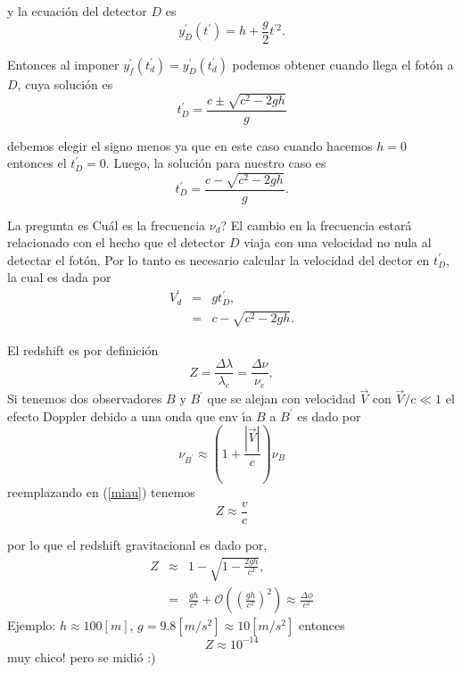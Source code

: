 \documentclass[notitlepage,11pt]{article}
\begin{document}
y la ecuaci\'{o}n del detector $D$ es 
\begin{equation}
y_{D}^{\prime }\left( t^{\prime }\right) =h+\frac{g}{2}t^{\prime 2}.
\end{equation}

Entonces al imponer $y_{f}^{\prime }\left( t_{d}^{\prime }\right)
=y_{D}^{\prime }\left( t_{d}^{\prime }\right) $ podemos obtener cuando llega
el fot\'{o}n a $D$, cuya soluci\'{o}n es 
\begin{equation*}
t_{D}^{\prime }=\frac{c\pm \sqrt{c^{2}-2gh}}{g}
\end{equation*}

debemos elegir el signo menos ya que en este caso cuando hacemos $h=0$
entonces el $t_{D}^{\prime }=0$. Luego, la soluci\'{o}n para nuestro caso es 
\begin{equation}
t_{D}^{\prime }=\frac{c-\sqrt{c^{2}-2gh}}{g}.
\end{equation}

La pregunta es \textquestiondown Cu\'{a}l es la frecuencia $\nu _{d}$? El
cambio en la frecuencia estar\'{a} relacionado con el hecho que el detector $%
D$ viaja con una velocidad no nula al detectar el fot\'{o}n. Por lo tanto es
necesario calcular la velocidad del dector en $t_{D}^{\prime }$, la cual es
dada por 
\begin{eqnarray*}
V_{d}^{\prime } &=&gt_{D}^{\prime }, \\
&=&c-\sqrt{c^{2}-2gh}.
\end{eqnarray*}

El redshift es por definici\'{o}n 
\begin{equation}
Z=\frac{\Delta \lambda }{\lambda _{e}}=\frac{\Delta \nu }{\nu _{e}},
\label{miau}
\end{equation}%
Si tenemos dos observadores $B$ y $B^{\prime }$ que se alejan con velocidad $%
\vec{V}$ con $\vec{V}/c\ll 1$ el efecto Doppler debido a una onda que env%
\'{\i}a $B$ a $B^{\prime }$ es dado por 
\begin{equation*}
\nu _{B^{\prime }}\approx \left( 1+\frac{\left\vert \vec{V}\right\vert }{c}%
\right) \nu _{B}
\end{equation*}%
reemplazando en (\ref{miau}) tenemos%
\begin{equation*}
Z\approx \frac{v}{c}
\end{equation*}

por lo que el redshift gravitacional es dado por, 
\begin{eqnarray*}
Z &\approx &1-\sqrt{1-\frac{2gh}{c^{2}}}, \\
&=&\frac{gh}{c^{2}}+\mathcal{O}\left( \left( \frac{gh}{c^{2}}\right)
^{2}\right) \approx \frac{\Delta \phi }{c^{2}}
\end{eqnarray*}%
Ejemplo: $h\approx 100\left[ m\right] $, $g=9.8\left[ m/s^{2}\right] \approx
10\left[ m/s^{2}\right] $ entonces 
\begin{equation*}
Z\approx 10^{-14}
\end{equation*}%
muy chico! pero se midi\'{o} :)
\end{document}
